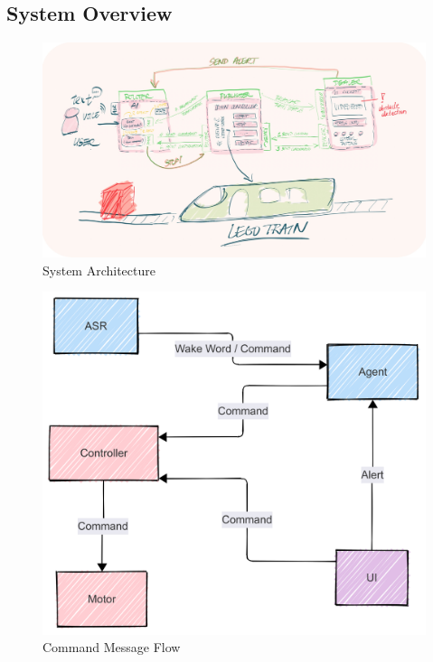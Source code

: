 \subsection{System Overview}

\begin{figure}[H]
\label{fig:system_architecture}
    \centering
    \includegraphics[width=\textwidth]{docs/system.jpg}
    \caption{System Architecture}
\end{figure}

\begin{figure}[H]
    \centering
    \label{fig:graph}
    \includegraphics[width=\textwidth]{docs/command_flow.png}
    \caption{Command Message Flow}
\end{figure} 

